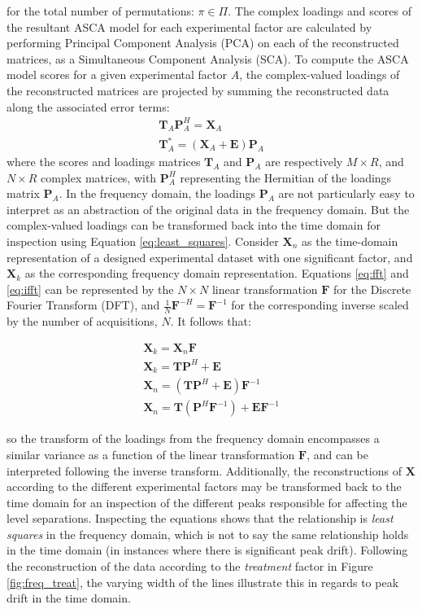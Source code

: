 \documentclass[preprint,12pt]{elsarticle}
\begin{document}
\noindent for the total number of permutations: $\pi \in \Pi$. The complex loadings and scores of the resultant ASCA model for each experimental factor are calculated by performing Principal Component Analysis (PCA) on each of the reconstructed matrices, as a Simultaneous Component Analysis (SCA). To compute the ASCA model scores for a given experimental factor $A$, the complex-valued loadings of the reconstructed matrices are projected by summing the reconstructed data along the associated error terms:
%
\begin{align}\label{eq:asca}
    \mathbf{T}_A\mathbf{P}_A^H = \mathbf{X}_A \\
    \mathbf{T}^*_A = (\mathbf{X}_A + \mathbf{E})\mathbf{P}_A
\end{align}
%
\noindent where the scores and loadings matrices $\mathbf{T}_A$ and $\mathbf{P}_A$ are respectively $M \times R$, and $N \times R$ complex matrices, with $\mathbf{P}_A^H$ representing the Hermitian of the loadings matrix $\mathbf{P}_A$. In the frequency domain, the loadings $\mathbf{P}_A$ are not particularly easy to interpret as an abstraction of the original data in the frequency domain. But the complex-valued loadings can be transformed back into the time domain for inspection using Equation \ref{eq:least_squares}. Consider $\mathbf{X}_n$ as the time-domain representation of a designed experimental dataset with one significant factor, and $\mathbf{X}_k$ as the corresponding frequency domain representation. Equations \ref{eq:fft} and \ref{eq:ifft} can be represented by the $N\times N$ linear transformation $\mathbf{F}$ for the Discrete Fourier Transform (DFT), and $\frac{1}{N}\mathbf{F}^{-H} = \mathbf{F}^{-1}$ for the corresponding inverse scaled by the number of acquisitions, $N$. It follows that:

\begin{align}\label{eq:least_squares}
    \mathbf{X}_k = \mathbf{X}_n\mathbf{F}\\
    \mathbf{X}_k = \mathbf{T}\mathbf{P}^H + \mathbf{E}\\
    \mathbf{X}_n = \left(\mathbf{T}\mathbf{P}^H + \mathbf{E}\right)\mathbf{F}^{-1}\\
    \mathbf{X}_n = \mathbf{T}\left(\mathbf{P}^H\mathbf{F}^{-1}\right) + \mathbf{E}\mathbf{F}^{-1}
\end{align}

\noindent so the transform of the loadings from the frequency domain encompasses a similar variance as a function of the linear transformation $\mathbf{F}$, and can be interpreted following the inverse transform. Additionally, the reconstructions of $\mathbf{X}$ according to the different experimental factors may be transformed back to the time domain for an inspection of the different peaks responsible for affecting the level separations. Inspecting the equations shows that the relationship is \textit{least squares} in the frequency domain, which is not to say the same relationship holds in the time domain (in instances where there is significant peak drift). Following the reconstruction of the data according to the \textit{treatment} factor in Figure \ref{fig:freq_treat}, the varying width of the lines illustrate this in regards to peak drift in the time domain.
\end{document}

